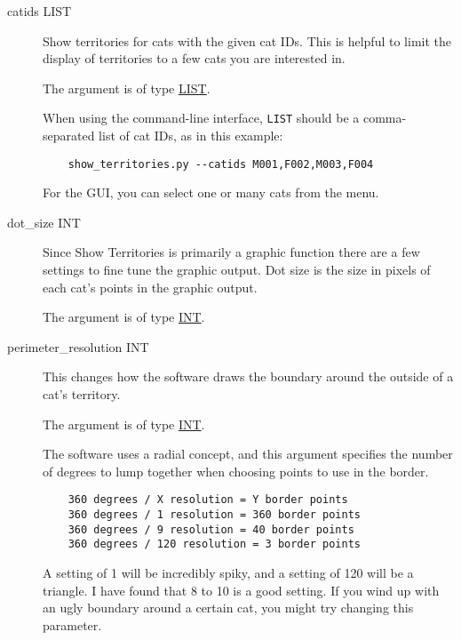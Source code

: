 \begin{description}

\item[catids LIST]
\hypertarget{territory-catids}{}

Show territories for cats with the given cat IDs. This is helpful to
limit the display of territories to a few cats you are interested in.

The argument is of type \hyperlink{argument-type-int}{LIST}.

When using the command-line interface, \texttt{LIST} should be a
comma-separated list of cat IDs, as in this example:

\begin{verbatim}
    show_territories.py --catids M001,F002,M003,F004
\end{verbatim}

For the GUI, you can select one or many cats from the menu.

\item[dot\_size INT]
\hypertarget{territory-dot-size}{}

Since Show Territories is primarily a graphic function there are a few
settings to fine tune the graphic output. Dot size is the size in
pixels of each cat's points in the graphic output.

The argument is of type \hyperlink{argument-type-int}{INT}.

\item[perimeter\_resolution INT]
\hypertarget{territory-perimeter-resolution}{}

This changes how the software draws the boundary around the outside of
a cat's territory.

The argument is of type \hyperlink{argument-type-int}{INT}.

The software uses a radial concept, and this argument specifies the
number of degrees to lump together when choosing points to use in the
border.

\begin{verbatim}
    360 degrees / X resolution = Y border points
    360 degrees / 1 resolution = 360 border points
    360 degrees / 9 resolution = 40 border points
    360 degrees / 120 resolution = 3 border points
\end{verbatim}

A setting of 1 will be incredibly spiky, and a setting of 120 will be
a triangle. I have found that 8 to 10 is a good setting. If you wind
up with an ugly boundary around a certain cat, you might try changing
this parameter.


\end{description}
